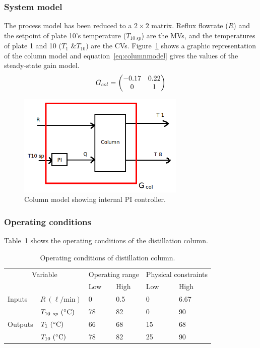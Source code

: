 \subsubsection{System model}
The process model has been reduced to a $2\times2$ matrix.
Reflux flowrate ($R$) and the setpoint of plate 10's temperature ($T_{10~sp}$) are the MVs, and the temperatures of plate 1 and 10 ($T_1\text{ \& }T_{10}$) are the CVs.
Figure~\ref{fig:columnmodel} shows a graphic representation of the column model and equation~\ref{eq:columnmodel} gives the values of the steady-state gain model.
\begin{equation}
  \label{eq:columnmodel}
  G_{col} = \begin{pmatrix} -0.17 & 0.22 \\
            0    & 1    \\ \end{pmatrix}
\end{equation}
\begin{figure}[htbp]
  \centering
    \includegraphics[width=8cm]{graph/columnmodel}
  \caption[Column model]{Column model showing internal PI controller.}
  \label{fig:columnmodel}
\end{figure}


\subsubsection{Operating conditions}
Table~\ref{tab:columnopcon} shows the operating conditions of the distillation column.
\begin{table}[htbp]
  \centering
  \begin{tabular}{llllll}
    \toprule
    \multicolumn{2}{c}{Variable} & \multicolumn{2}{c}{Operating range} & \multicolumn{2}{c}{Physical constraints} \\
    && Low & High & Low & High \\ 
    \midrule
    Inputs &$R~(\ell\text{/min})$    & 0 & 0.5 & 0 & 6.67 \\
           &$T_{10~sp}~(^{\circ}\text{{C}})$ & 78 & 82 & 0 & 90 \\[1.3ex]
    Outputs &$T_1~(^{\circ}\text{{C}})$     & 66 & 68 & 15 & 68 \\
            &$T_{10}~(^{\circ}\text{{C}})$  & 78 & 82 & 25 & 90 \\
    \bottomrule
  \end{tabular}
  \caption{Operating conditions of distillation column.}
  \label{tab:columnopcon}
\end{table}


